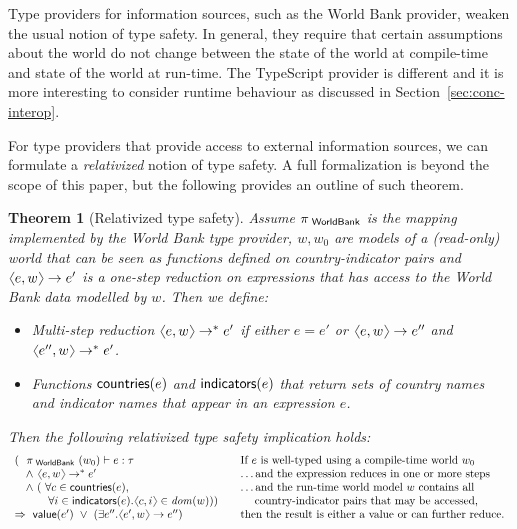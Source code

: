 \documentclass[submission,copyright,creativecommons]{eptcs}
\newcommand{\langl}{\begin{picture}(4.5,7)
\put(1.1,2.5){\rotatebox{60}{\line(1,0){5.5}}}
\put(1.1,2.5){\rotatebox{300}{\line(1,0){5.5}}}
\end{picture}}
\newcommand{\rangl}{\begin{picture}(4.5,7)
\put(.9,2.5){\rotatebox{120}{\line(1,0){5.5}}}
\put(.9,2.5){\rotatebox{240}{\line(1,0){5.5}}}
\end{picture}}
\newcommand{\ident}[1]{\textnormal{\sffamily #1}}
\newtheorem*{theorem*}{Theorem}
\begin{document}
Type providers for information sources, such as the World Bank provider, weaken the usual notion 
of type safety. In general, they require that certain assumptions about the world do not change
between the state of the world at compile-time and state of the world at run-time. The TypeScript
provider is different and it is more interesting to consider runtime behaviour as discussed
in Section~\ref{sec:conc-interop}.

For type providers that provide access to external information sources, we can formulate a 
\emph{relativized} notion of type safety. A full formalization is beyond the scope of this
paper, but the following provides an outline of such theorem.

\begin{theorem*}[Relativized type safety]
Assume $\pi_{\ident{~WorldBank}}$ is the mapping implemented by the World Bank type provider,
$w, w_0$ are models of a (read-only) world that can be seen as functions defined on country-indicator
pairs and $\langl e, w \rangl \rightarrow e'$ is a one-step reduction on expressions that has 
access to the World Bank data modelled by $w$. Then we define:

\begin{itemize}
\item
Multi-step reduction $\langl e, w \rangl \rightarrow^* e'$ if either $e=e'$
or $\langl e, w \rangl \rightarrow e''$ and $\langl e'', w \rangl \rightarrow^* e'$. 
\item
Functions $\ident{countries}(e)$ and $\ident{indicators}(e)$ that return sets of 
country names \\and indicator names that appear in an expression $e$. 
\end{itemize}
%
Then the following \emph{relativized type safety} implication holds:
%
\begin{equation*}
\begin{array}{lcl}
(~~\pi_{\ident{~WorldBank}}~(w_0) \vdash e : \tau 
  && \textnormal{If $e$ is well-typed using a compile-time world $w_0$}
\\
\quad \wedge~ \langl e, w \rangl \rightarrow^* e'
  && \textnormal{\ldots and the expression reduces in one or more steps}
\\
\quad \wedge~ (~\forall c \in \ident{countries}(e), 
  && \textnormal{\ldots and the run-time world model $w$ contains all}
\\
       \qquad~~~ \forall i \in \ident{indicators}(e) . \langl c, i \rangl \in \mathit{dom}(w)))
  && \textnormal{\;\quad country-indicator pairs that may be accessed,} 
\\
\Rightarrow ~\ident{value}(e') ~\vee~ (\exists e'' . \langl e', w \rangl \rightarrow e'') 
  && \textnormal{then the result is either a value or can further reduce.}
\end{array}
\end{equation*}
\end{theorem*}
\end{document}
